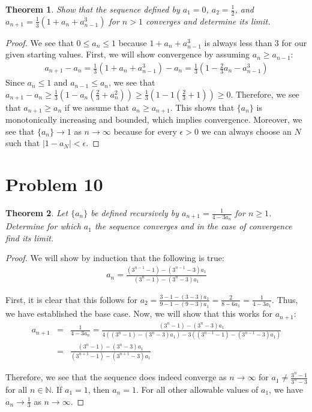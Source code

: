 \documentclass[psamsfonts]{amsart}
\newtheorem{thm}{Theorem}[section]
\theoremstyle{definition}
\theoremstyle{remark}
\numberwithin{equation}{section}
\begin{document}
\begin{thm}
Show that the sequence defined by $a_1 = 0$, $a_2 = \frac{1}{2}$, and $a_{n+1} = \frac{1}{3} (1 + a_n + a_{n-1}^3)$ for $ n >1$ converges and determine its limit.
\end{thm}

\begin{proof}
We see that $0 \leq a_n \leq 1$ because $1 + a_n + a_{n-1}^3$ is always less than 3 for our given starting values. First, we will show convergence by assuming $a_n \geq a_{n-1}$:
\begin{eqnarray}
a_{n+1} - a_{n} = \frac{1}{3} (1 + a_n + a_{n-1}^3 )  - a_n = \frac{1}{3} \left( 1 - \frac{2}{3} a_n - a_{n-1}^3 \right)
\end{eqnarray}
Since $a_n \leq 1$ and $a_{n-1} \leq a_n$, we see that $a_{n+1} - a_n \geq \frac{1}{3} (1 - a_n (\frac{2}{3} + a_n^2)) \geq \frac{1}{3}(1 - 1 (\frac{2}{3} + 1)) \geq 0$. Therefore, we see that $a_{n+1} \geq a_n$ if we assume that $a_n \geq a_{n+1}$. This shows that $\{a_n\}$ is monotonically increasing and bounded, which implies convergence. Moreover, we see that $\{a_n\} \to 1$ as $n \to \infty$ because for every $\epsilon > 0$ we can always choose an $N$ such that $|1 - a_N| < \epsilon$.
\end{proof}

\section{Problem 10}

\begin{thm}
Let $\{ a_n \}$ be defined recursively by $a_{n+1} = \frac{1}{4 - 3 a_n}$ for $n \geq 1$. Determine for which $a_1$ the sequence converges and in the case of convergence find its limit. 
\end{thm}

\begin{proof}
We will show by induction that the following is true:
\begin{eqnarray}
a_n = \frac{(3^{n-1} - 1) - (3^{n-1}-3)a_1}{(3^{n} - 1) - (3^{n} - 3)a_1} 
\end{eqnarray}

First, it is clear that this follows for $a_2 = \frac{3 -1 - (3-3)a_1}{9-1 - (9-3)a_1} = \frac{2}{8 - 6 a_1} = \frac{1}{4 - 3 a_1}$. Thus, we have established the base case. Now, we will show that this works for $a_{n+1}$:
\begin{eqnarray}
a_{n+1} &=& \frac{1}{4 - 3 a_n} = \frac{(3^n - 1) - (3^n - 3)a_1}{4((3^n-1)-(3^n-3)a_1) - 3((3^{n-1}-1) - (3^{n-1}-3)a_1)} \\
&=& \frac{(3^n - 1) - (3^n - 3)a_1}{(3^{n+1}-1)-(3^{n+1}-3)a_1}
\end{eqnarray}

Therefore, we see that the sequence does indeed converge as $n \to \infty$ for $a_1 \neq \frac{3^n-1}{3^n-3}$ for all $n \in \mathbb{N}$. If $a_1 =1$, then $a_n = 1$. For all other allowable values of $a_1$, we have $a_n \to \frac{1}{3}$ as $n \to \infty$.
\end{proof}
\end{document}
